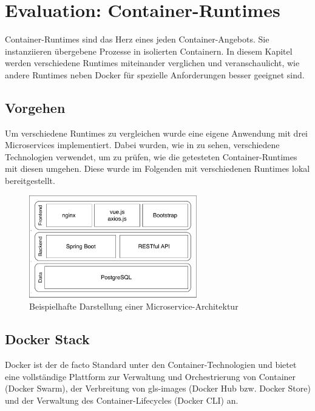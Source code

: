 \chapter{Evaluation: Container-Runtimes}
\label{chap:compCtnrRuntimes}

Container-Runtimes sind das Herz eines jeden Container-Angebots. Sie instanziieren übergebene Prozesse in isolierten Containern. In diesem Kapitel werden verschiedene Runtimes miteinander verglichen und veranschaulicht, wie andere Runtimes neben Docker für spezielle Anforderungen besser geeignet sind.

\section{Vorgehen}
\label{sec:vorgehen}
Um verschiedene Runtimes zu vergleichen wurde eine eigene Anwendung mit drei Microservices implementiert. Dabei wurden, wie in  zu sehen, verschiedene Technologien verwendet, um zu prüfen, wie die getesteten Container-Runtimes mit diesen umgehen. Diese wurde im Folgenden mit verschiedenen Runtimes lokal bereitgestellt.

\begin{figure}[h]
	\begin{center}
		\includegraphics[width=0.65\textwidth]{bilder/microservice-example-stack.pdf}
		\caption{Beispielhafte Darstellung einer Microservice-Architektur}
		\label{fig:todosStack}
	\end{center}
\end{figure}

\section{Docker Stack}
\label{sec:compDocker}
Docker ist der de facto Standard unter den Container-Technologien und bietet eine vollständige Plattform zur Verwaltung und Orchestrierung von Container (Docker Swarm), der Verbreitung von \glspl{gls-image} (Docker Hub bzw. Docker Store) und der Verwaltung des Container-Lifecycles (Docker CLI) an.


